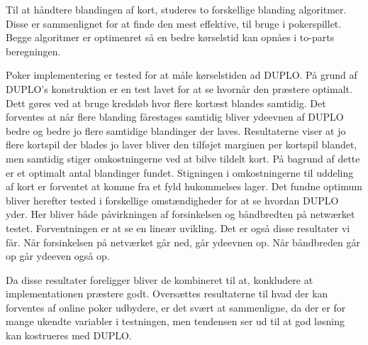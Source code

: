 \documentclass[twoside,11pt,openright]{report}
\begin{document}
Til at håndtere blandingen af kort, studeres to forskellige blanding algoritmer. Disse er sammenlignet for at finde den mest effektive, til bruge i pokerspillet. Begge algoritmer er optimenret så en bedre kørselstid kan opnåes i to-parts beregningen.

Poker implementering er tested for at måle kørselstiden ad DUPLO. På grund af DUPLO's konstruktion er en test lavet for at se hvornår den præstere optimalt. Dett gøres ved at bruge kredsløb hvor flere kortæst blandes samtidig. Det forventes at når flere blanding fårestages samtidig bliver ydeevnen af DUPLO bedre og bedre jo flere samtidige blandinger der laves. Resultaterne viser at jo flere kortspil der blades jo laver bliver den tilføjet marginen per kortspil blandet, men samtidig stiger omkostningerne ved at bilve tildelt kort. På bagrund af dette er et optimalt antal blandinger fundet. Stigningen i omkostningerne til uddeling af kort er forventet at komme fra et fyld hukommelses lager. Det fundne optimum bliver herefter tested i forskellige omstændigheder for at se hvordan DUPLO yder. Her bliver både påvirkningen af forsinkelsen og båndbredten på netwærket testet. Forventningen er at se en lineær uvikling. Det er også disse resultater vi får. Når forsinkelsen  på netværket går ned, går ydeevnen op. Når båndbreden går op går ydeeven også op.

Da disse resultater foreligger bliver de kombineret til at, konkludere at implementationen præstere godt. Oversættes resultaterne til hvad der kan forventes af online poker udbydere, er det svært at sammenligne, da der er for mange ukendte variabler i testningen, men tendensen ser ud til at god løsning kan kostrueres med DUPLO.


\end{document}
